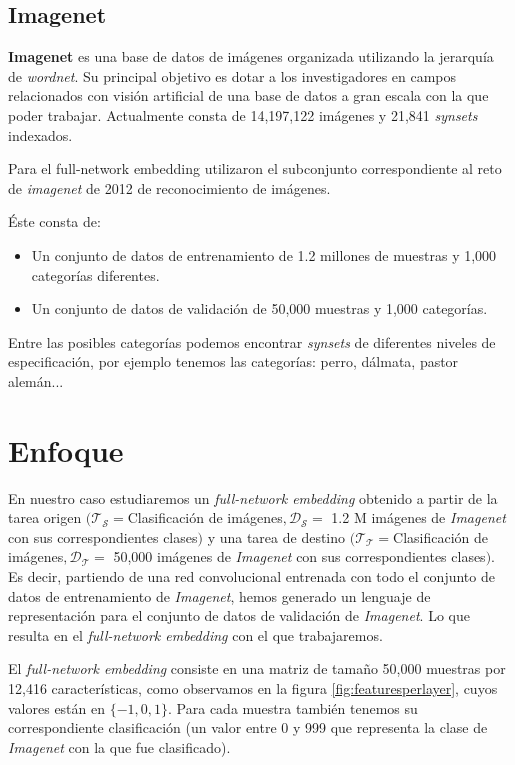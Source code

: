 \documentclass[12,twoside]{TFG-GM}
\theoremstyle{definition}
\theoremstyle{remark}
\begin{document}
\subsection{Imagenet}

\textbf{Imagenet} es una base de datos de imágenes organizada utilizando la jerarquía de \textit{wordnet}. Su principal objetivo es dotar a los investigadores en campos relacionados con visión artificial de una base de datos a gran escala con la que poder trabajar. Actualmente consta de 14,197,122 imágenes y  21,841 \textit{synsets} indexados.  

Para el full-network embedding utilizaron el subconjunto correspondiente al reto de \textit{imagenet} de 2012 de reconocimiento de imágenes. 

Éste consta de:
\begin{itemize}
\item Un conjunto de datos de entrenamiento de 1.2 millones de muestras y 1,000 categorías diferentes.
\item Un conjunto de datos de validación de 50,000 muestras y 1,000 categorías. 
\end{itemize}

Entre las posibles categorías podemos encontrar \textit{synsets} de diferentes niveles de especificación, por ejemplo tenemos las categorías: perro, dálmata, pastor alemán... 

\newpage
\section{Enfoque}
\label{sec:enfoque}
En nuestro caso estudiaremos un \textit{full-network embedding} obtenido a partir de la tarea origen  $(\mathcal{T_S} = $Clasificación de imágenes$,\mathcal{D_S} =$ 1.2 M imágenes de \textit{Imagenet} con sus correspondientes clases$ )$ y una tarea de destino $(\mathcal{T_T} = $Clasificación de imágenes$,\mathcal{D_T} =$ 50,000 imágenes de \textit{Imagenet} con sus correspondientes clases$ )$. Es decir, partiendo de una red convolucional entrenada con todo el conjunto de datos de entrenamiento de \textit{Imagenet}, hemos generado un lenguaje de representación para el conjunto de datos de validación de \textit{Imagenet}. Lo que resulta en el \textit{full-network embedding} con el que trabajaremos. 

El \textit{full-network embedding} consiste en una matriz de tamaño 50,000 muestras por 12,416 características, como observamos en la figura \ref{fig:featuresperlayer}, cuyos valores están en $\{-1,0,1\}$. Para cada muestra también tenemos su correspondiente clasificación (un valor entre 0 y 999 que representa la clase de \textit{Imagenet} con la que fue clasificado).
\end{document}

